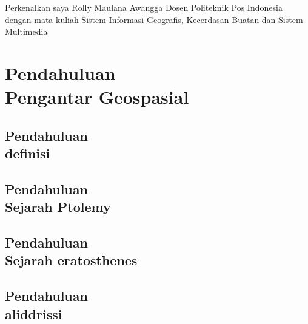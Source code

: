 \documentclass{WileySix}
\begin{document}



\begin{introduction}
 Perkenalkan saya Rolly Maulana Awangga Dosen Politeknik Pos Indonesia dengan mata kuliah
Sistem Informasi Geografis, Kecerdasan Buatan dan Sistem Multimedia
\end{introduction}

\part[Pendahuluan]
{Pendahuluan\\ Pengantar Geospasial}

\chapter[Definisi]
{Pendahuluan\\ definisi}


\chapter[Sejarah Ptolemy]
{Pendahuluan\\ Sejarah Ptolemy}


\chapter[Sejarah eratosthenes]
{Pendahuluan\\ Sejarah eratosthenes}



\chapter[Sejarah aliddrissi]
{Pendahuluan\\ aliddrissi}

\end{document}
